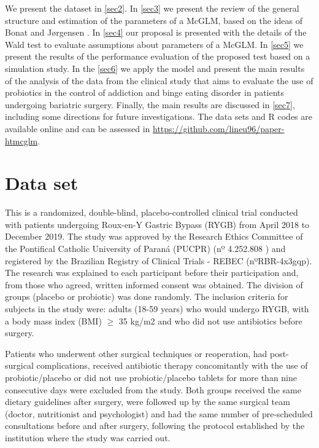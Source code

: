 \documentclass[AMA,STIX1COL]{WileyNJD-v2}
\begin{document}
We present the dataset in \autoref{sec2}. In \autoref{sec3} we present the review of the general structure and estimation of the parameters of a McGLM, based on the ideas of Bonat and Jørgensen \cite{Bonat16}. In \autoref{sec4} our proposal is presented with the details of the Wald test to evaluate assumptions about parameters of a McGLM. In \autoref{sec5} we present the results of the performance evaluation of the proposed test based on a simulation study. In the \autoref{sec6} we apply the model and present the main results of the analysis of the data from the clinical study that aims to evaluate the use of probiotics in the control of addiction and binge eating disorder in patients undergoing bariatric surgery. Finally, the main results are discussed in \autoref{sec7}, including some directions for future investigations. The data sets and R codes are available online and can be assessed in \href{https://github.com/lineu96/paper-htmcglm}{https://github.com/lineu96/paper-htmcglm}.


\section{Data set}\label{sec2}


This is a randomized, double-blind, placebo-controlled clinical trial conducted with patients undergoing Roux-en-Y Gastric Bypass (RYGB) from April 2018 to December 2019. The study was approved by the Research Ethics Committee of the Pontifical Catholic University of Paraná (PUCPR) (nº 4.252.808 ) and registered by the Brazilian Registry of Clinical Trials - REBEC (nºRBR-4x3gqp). The research was explained to each participant before their participation and, from those who agreed, written informed consent was obtained. The division of groups (placebo or probiotic) was done randomly. The inclusion criteria for subjects in the study were: adults (18-59 years) who would undergo RYGB, with a body mass index (BMI) $\geq$ 35 kg/m2 and who did not use antibiotics before surgery. 

Patients who underwent other surgical techniques or reoperation, had post-surgical complications, received antibiotic therapy concomitantly with the use of probiotic/placebo or did not use probiotic/placebo tablets for more than nine consecutive days were excluded from the study. Both groups received the same dietary guidelines after surgery, were followed up by the same surgical team (doctor, nutritionist and psychologist) and had the same number of pre-scheduled consultations before and after surgery, following the protocol established by the institution where the study was carried out.
\end{document}
